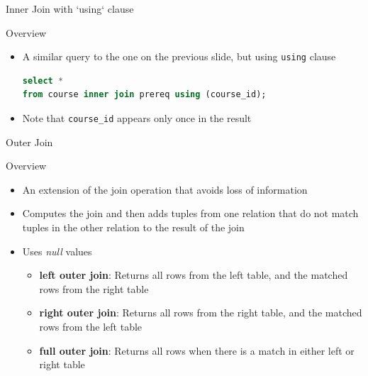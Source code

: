 \documentclass[aspectratio=169, xcolor=dvipsnames]{beamer}
\begin{document}
\begin{frame}[fragile]{Inner Join with `using` clause}
    \begin{block}{Overview}
        \begin{itemize}[<+->]
            \item A similar query to the one on the previous slide, but using \texttt{using} clause
            \begin{lstlisting}[language=SQL]
select * 
from course inner join prereq using (course_id);
            \end{lstlisting}
            \item Note that \texttt{course\_id} appears only once in the result
        \end{itemize}
    \end{block}
\end{frame}

\begin{frame}[fragile]{Outer Join}
    \begin{block}{Overview}
        \begin{itemize}[<+->]
            \item An extension of the join operation that avoids loss of information
            \item Computes the join and then adds tuples from one relation that do not match tuples in the other relation to the result of the join
            \item Uses \textit{null} values
            \begin{itemize}
                \item[$\triangleright$] \textbf{left outer join}: Returns all rows from the left table, and the matched rows from the right table
                \item[$\triangleright$] \textbf{right outer join}: Returns all rows from the right table, and the matched rows from the left table
                \item[$\triangleright$] \textbf{full outer join}: Returns all rows when there is a match in either left or right table
            \end{itemize}
        \end{itemize}
    \end{block}
\end{frame}
\end{document}
